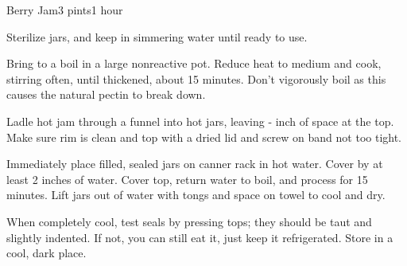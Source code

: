 \documentclass[../Cookbook.tex]{subfiles}
\begin{document}
\begin{recipe}{Berry Jam}{3 pints}{1 hour}

Sterilize jars, and keep in simmering water until ready to use.

Bring to a boil in a large nonreactive pot. Reduce heat to medium and cook, stirring often, until thickened, about 15 minutes. Don't vigorously boil as this causes the natural pectin to break down.

Ladle hot jam through a funnel into hot jars, leaving - inch of space at the top. Make sure rim is clean and top with a dried lid and screw on band not too tight.

Immediately place filled, sealed jars on canner rack in hot water. Cover by at least 2 inches of water. Cover top, return water to boil, and process for 15 minutes. %
Lift jars out of water with tongs and space on towel to cool and dry.

When completely cool, test seals by pressing tops; they should be taut and slightly indented. If not, you can still eat it, just keep it refrigerated. Store in a cool, dark place.

\end{recipe}
\end{document}
